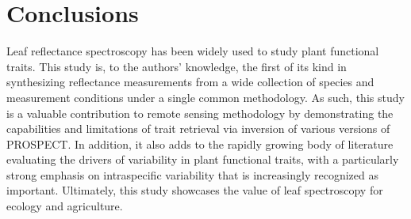 \section{Conclusions}

Leaf reflectance spectroscopy has been widely used to study plant functional traits.
This study is, to the authors' knowledge, the first of its kind in synthesizing reflectance measurements from a wide collection of species and measurement conditions under a single common methodology.
As such, this study is a valuable contribution to remote sensing methodology by demonstrating the capabilities and limitations of trait retrieval via inversion of various versions of PROSPECT\@.
In addition, it also adds to the rapidly growing body of literature evaluating the drivers of variability in plant functional traits, with a particularly strong emphasis on intraspecific variability that is increasingly recognized as important.
Ultimately, this study showcases the value of leaf spectroscopy for ecology and agriculture.
